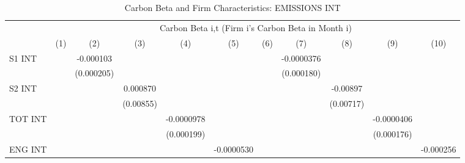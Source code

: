 \begin{table}[htbp]\centering
\def\sym#1{\ifmmode^{#1}\else\(^{#1}\)\fi}
\caption{Carbon Beta and Firm Characteristics: EMISSIONS INT}
\begin{tabular}{l*{10}{c}}
\hline\hline
                &\multicolumn{10}{c}{Carbon Beta i,t (Firm i's Carbon Beta in Month i)}                                                                                                                       \\\cmidrule(lr){2-11}
                &\multicolumn{1}{c}{(1)}         &\multicolumn{1}{c}{(2)}         &\multicolumn{1}{c}{(3)}         &\multicolumn{1}{c}{(4)}         &\multicolumn{1}{c}{(5)}         &\multicolumn{1}{c}{(6)}         &\multicolumn{1}{c}{(7)}         &\multicolumn{1}{c}{(8)}         &\multicolumn{1}{c}{(9)}         &\multicolumn{1}{c}{(10)}         \\
\hline
S1 INT          &                  &-0.000103         &                  &                  &                  &                  &-0.0000376         &                  &                  &                  \\
                &                  &(0.000205)         &                  &                  &                  &                  &(0.000180)         &                  &                  &                  \\
S2 INT          &                  &                  & 0.000870         &                  &                  &                  &                  & -0.00897         &                  &                  \\
                &                  &                  &(0.00855)         &                  &                  &                  &                  &(0.00717)         &                  &                  \\
TOT INT         &                  &                  &                  &-0.0000978         &                  &                  &                  &                  &-0.0000406         &                  \\
                &                  &                  &                  &(0.000199)         &                  &                  &                  &                  &(0.000176)         &                  \\
ENG INT         &                  &                  &                  &                  &-0.0000530         &                  &                  &                  &                  &-0.000256         \\

\end{tabular}
\end{table}
